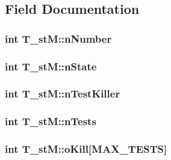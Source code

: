 \subsection{Field Documentation}
\hypertarget{structT__stM_a3e49f3f7f8adb93d6eb5121f84c33816}{
\subsubsection[{n\-Number}]{\setlength{\rightskip}{0pt plus 5cm}int T\-\_\-st\-M\-::n\-Number}}\label{structT__stM_a3e49f3f7f8adb93d6eb5121f84c33816}
\hypertarget{structT__stM_a5dd1d5b522750b22895aa1146c06c3a6}{
\subsubsection[{n\-State}]{\setlength{\rightskip}{0pt plus 5cm}int T\-\_\-st\-M\-::n\-State}}\label{structT__stM_a5dd1d5b522750b22895aa1146c06c3a6}
\hypertarget{structT__stM_afb940fe5fd0991972e5ee8822805d10e}{
\subsubsection[{n\-Test\-Killer}]{\setlength{\rightskip}{0pt plus 5cm}int T\-\_\-st\-M\-::n\-Test\-Killer}}\label{structT__stM_afb940fe5fd0991972e5ee8822805d10e}
\hypertarget{structT__stM_a145001a7ab272ff272400d654985aaed}{
\subsubsection[{n\-Tests}]{\setlength{\rightskip}{0pt plus 5cm}int T\-\_\-st\-M\-::n\-Tests}}\label{structT__stM_a145001a7ab272ff272400d654985aaed}
\hypertarget{structT__stM_a607d25dfebe1f4c7fa623e1c11e596ac}{
\subsubsection[{o\-Kill}]{\setlength{\rightskip}{0pt plus 5cm}int T\-\_\-st\-M\-::o\-Kill\mbox{[}{\bf M\-A\-X\-\_\-\-T\-E\-S\-T\-S}\mbox{]}}}\label{structT__stM_a607d25dfebe1f4c7fa623e1c11e596ac}

